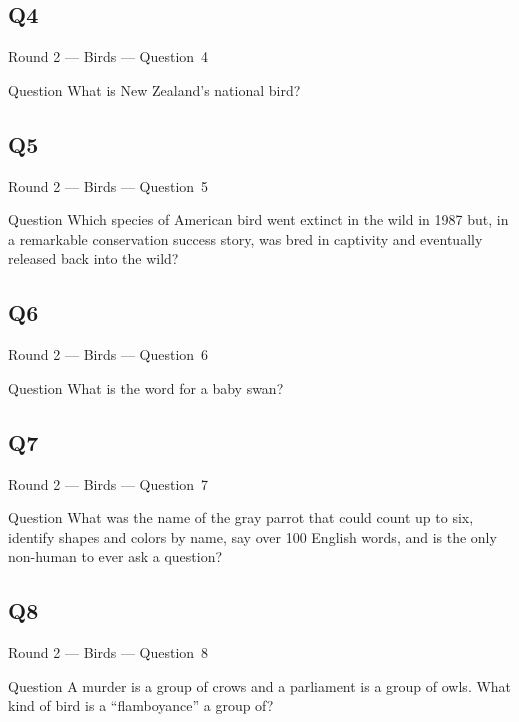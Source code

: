 \documentclass[11pt]{beamer}
\begin{document}
\subsection*{Q4}
\begin{frame}[t]{Round 2 --- Birds --- \mbox{Question 4}}
    \vspace{-0.5em}
    \begin{block}{Question}
        What is New Zealand's national bird?
    \end{block}
\end{frame}
\subsection*{Q5}
\begin{frame}[t]{Round 2 --- Birds --- \mbox{Question 5}}
    \vspace{-0.5em}
    \begin{block}{Question}
        Which species of American bird went extinct in the wild in 1987 but, in a remarkable conservation success story, was bred in captivity and eventually released back into the wild?
    \end{block}
\end{frame}
\subsection*{Q6}
\begin{frame}[t]{Round 2 --- Birds --- \mbox{Question 6}}
    \vspace{-0.5em}
    \begin{block}{Question}
        What is the word for a baby swan?
    \end{block}
\end{frame}
\subsection*{Q7}
\begin{frame}[t]{Round 2 --- Birds --- \mbox{Question 7}}
    \vspace{-0.5em}
    \begin{block}{Question}
        What was the name of the gray parrot that could count up to six, identify shapes and colors by name, say over 100 English words, and is the only non-human to ever ask a question?
    \end{block}
\end{frame}
\subsection*{Q8}
\begin{frame}[t]{Round 2 --- Birds --- \mbox{Question 8}}
    \vspace{-0.5em}
    \begin{block}{Question}
        A murder is a group of crows and a parliament is a group of owls. What kind of bird is a ``flamboyance'' a group of?
    \end{block}
\end{frame}
\end{document}
